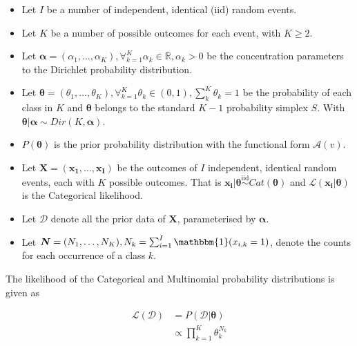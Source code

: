 \begin{itemize}
	\item Let $I$ be a number of independent, identical (iid) random events.

	\item Let $K$ be a number of possible outcomes for each event, with $K \geq 2$.

	\item Let $\boldsymbol{\alpha} = (\alpha_{1}, \dots, \alpha_{K}), \forall_{k=1}^{K} \alpha_{k} \in \mathbb{R}, \alpha_{k} > 0$ be the concentration parameters to the Dirichlet probability distribution.

	\item Let $\boldsymbol{\theta} = (\theta_{1}, \dots, \theta_{K}), \forall_{k=1}^{K} \theta_{k} \in (0,1), \sum_{k}^{K} \theta_{k} = 1$ be the probability of each class in $K$ and $\boldsymbol{\theta}$ belongs to the standard $K-1$ probability simplex $S$. With $\boldsymbol{\theta} | \boldsymbol{\alpha} \sim Dir(K, \boldsymbol{\alpha})$.

	\item $P(\boldsymbol{\theta})$ is the prior probability distribution with the functional form $\mathcal{A}(v)$.

	\item Let $\boldsymbol{X} = (\boldsymbol{x_{1}}, \dots, \boldsymbol{x_{I}})$ be the outcomes of $I$ independent, identical random events, each with $K$ possible outcomes. That is $\boldsymbol{x_{i}} | \boldsymbol{\theta} \overset{\text{iid}}{\sim} Cat(\boldsymbol{\theta})$ and $\mathcal{L}(\boldsymbol{x_{i}} \vert \boldsymbol{\theta})$ is the Categorical likelihood.

	\item Let $\boldsymbol{\mathcal{D}}$ denote all the prior data of $\boldsymbol{X}$, parameterised by $\boldsymbol{\alpha}$.

	\item Let $\boldsymbol{N} = (N_{1}, \dots, N_{K}), N_{k} = \sum_{i=1}^{I} \mathbbm{1}(x_{i,k} = 1)$, denote the counts for each occurrence of a class $k$.
\end{itemize}

The likelihood of the Categorical and Multinomial probability distributions is given as

\begin{equation}
	\label{eq:probability:conjugate_priors:mult_likelihood:likelihood}
	\begin{split}
		\mathcal{L}(\boldsymbol{\mathcal{D}}) &=  P(\boldsymbol{\mathcal{D}} | \boldsymbol{\theta}) \\
		&\propto \prod_{k=1}^{K} \theta_{k}^{N_{k}}
	\end{split}
\end{equation}

